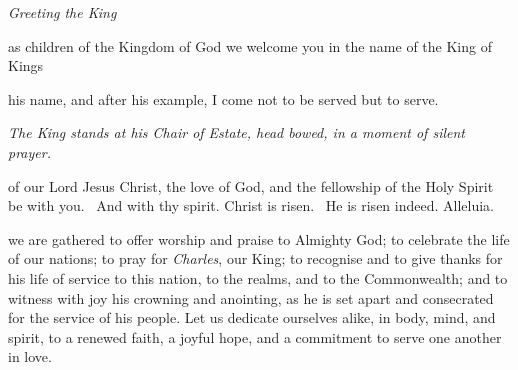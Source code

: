 {\begin{center}
	\Large{}		\caslorn{24}		
\end{center}
\begin{center}
	\Large{}		\caslorn{24}		
\end{center}



\vfill

\clearpage
\begin{center}
	\large\textit{\color{qred}Greeting the King}
\end{center}


\noindent{\itshape\textcolor{qred}{Young Person (Chapel Royal chorister):}}

 as children of the Kingdom of God we welcome you in the name of
the King of Kings

\vfill




 his name, and after his example, I come not to be served but to serve.


\vfill





\noindent\textit{\color{qred}The King stands at his Chair of Estate,
head bowed, in a moment of silent prayer.}

\clearpage



 of our Lord Jesus Christ,
the love of God,
and the fellowship of the Holy Spirit
be with you.  \rspns\ And with thy spirit.
\vfill
{} Christ is risen. \rspns\ He is risen indeed. Alleluia.

\vfill


we are gathered to offer worship
and praise to Almighty God;
to celebrate the life of our nations;
to pray for \textit{Charles}, our King;
to recognise and to give thanks for his life of service to this nation, to the
realms, and to the Commonwealth;
and to witness with joy
his crowning and anointing,
as he is set apart and consecrated
for the service of his people.
Let us dedicate ourselves alike,
in body, mind, and spirit,
to a renewed faith, a joyful hope,
and a commitment to serve one
another in love.

}
